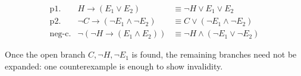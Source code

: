 \documentclass[border=8pt]{standalone}
\begin{document}
\begin{minipage}{0.98\textwidth}
\[
\begin{array}{rll}
\text{p1}. & H \rightarrow (E_1\vee E_2) & \equiv \neg H\vee E_1\vee E_2 \\
\text{p2}. & \neg C \rightarrow (\neg E_1\wedge\neg E_2) &
  \equiv C\vee(\neg E_1\wedge\neg E_2) \\
\text{neg-c}. & \neg(\neg H\rightarrow(E_1\wedge E_2)) &
  \equiv \neg H\wedge(\neg E_1\vee\neg E_2)
\end{array}
\]

\begin{center}

Once the open branch $C,\neg H,\neg E_1$ is found, the remaining branches
need not be expanded: one counterexample is enough to show invalidity.
\end{center}
\end{minipage}
\end{document}
